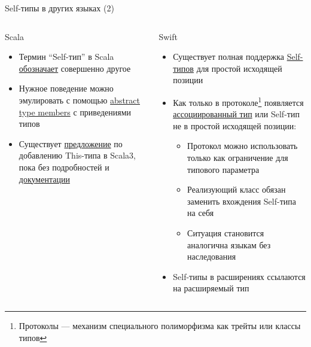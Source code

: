 \documentclass[handout,aspectratio=169,usenames,dvipsnames]{beamer}
\begin{document}
\begin{frame}[fragile]{Self-типы в других языках (2)}
    \begin{columns}[onlytextwidth]
        \begin{column}{0.46\textwidth}
            \begin{block}{Scala}
                \begin{itemize}
                    \item Термин ``Self-тип'' в Scala \href{https://docs.scala-lang.org/tour/self-types.html}{\color{blue} обозначает} совершенно другое
                    \item Нужное поведение можно эмулировать с помощью \href{https://docs.scala-lang.org/tour/abstract-type-members.html}{\color{blue}abstract type members} с приведениями типов
                    \item Существует \href{https://github.com/lampepfl/dotty/issues/7374}{\color{blue}предложение} по добавлению This-типа в Scala3, пока без подробностей и \href{http://dotty.epfl.ch/}{\color{blue}документации}
                \end{itemize}
            \end{block}
        \end{column}\hfill%
        \pause
        \begin{column}{0.51\textwidth}
            \begin{block}{Swift}
                \begin{itemize}
                    \item Существует полная поддержка \href{https://docs.swift.org/swift-book/documentation/the-swift-programming-language/types/\#Self-Type}{\color{blue}Self-типов} для простой исходящей позиции
                    \item Как только в протоколе\footnote{Протоколы --- механизм специального полиморфизма как трейты или классы типов} появляется \href{https://docs.swift.org/swift-book/documentation/the-swift-programming-language/generics/\#Associated-Types}{\color{blue}ассоциированный тип} или Self-тип не в простой исходящей позиции:
                    \begin{itemize}
                        \item Протокол можно использовать только как ограничение для типового параметра
                        \item Реализующий класс обязан заменить вхождения Self-типа на себя
                        \item Ситуация становится аналогична языкам без наследования
                    \end{itemize}
                    \item Self-типы в расширениях ссылаются на расширяемый тип
                \end{itemize}
            \end{block}
        \end{column}
    \end{columns}
\end{frame}
\end{document}
